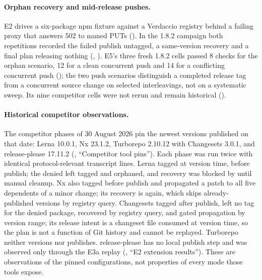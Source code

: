 \paragraph{Orphan recovery and mid-release pushes.}
E2 drives a six-package npm fixture against a Verdaccio registry behind a
failing proxy that answers 502 to named PUTs
(). In the 1.8.2 campaign both repetitions
recorded the failed publish untagged, a same-version recovery and a final plan
releasing nothing (, ).
E5's three fresh 1.8.2 cells passed 8 checks for the orphan scenario, 12 for
a clean concurrent push and 14 for a conflicting concurrent push
(); the two push scenarios distinguish a completed release tag from a
concurrent source change on selected interleavings, not on a systematic sweep.
Its nine competitor cells were not rerun and remain historical ().

\paragraph{Historical competitor observations.}
The competitor phases of 30 August 2026 pin the newest versions published on
that date: Lerna 10.0.1, Nx 23.1.2, Turborepo 2.10.12 with Changesets 3.0.1,
and release-please 17.11.2 (, ``Competitor tool
pins''). Each phase was run twice with identical protocol-relevant transcript
lines. Lerna tagged at version time, before publish; the denied 
left  tagged and orphaned, and recovery was blocked by
 until manual cleanup. Nx also tagged before publish and
propagated a patch to all five dependents of a minor change; its recovery is
 again, which skips already-published versions by
registry query. Changesets tagged after publish, left no tag for the denied
package, recovered by registry query, and gated propagation by version range;
its release intent is a changeset file consumed at version time, so the plan
is not a function of Git history and cannot be replayed. Turborepo neither
versions nor publishes. release-please has no local publish step and was
observed only through the E3a replay (, ``E2
extension results''). These are observations of the pinned configurations,
not properties of every mode those tools expose.

